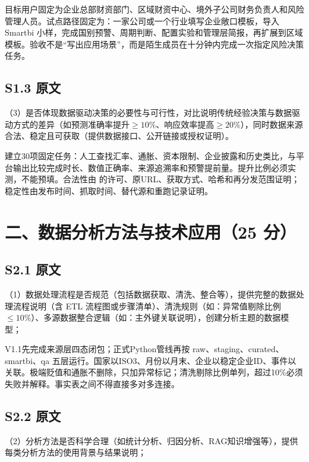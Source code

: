 \begin{decisionbox}[S1.2 怎么做]
目标用户固定为企业总部财资部门、区域财资中心、境外子公司财务负责人和风险管理人员。试点路径固定为：一家公司或一个行业填写企业敞口模板，导入 Smartbi 小样，完成国别预警、周期判断、配置实验和管理层简报，再扩展到区域模板。验收不是“写出应用场景”，而是陌生成员在十分钟内完成一次指定风险决策任务。
\end{decisionbox}

\subsection*{S1.3 原文}
（3）是否体现数据驱动决策的必要性与可行性，对比说明传统经验决策与数据驱动方式的差异（如预测准确率提升$\geq 10\%$、响应效率提高$\geq 20\%$），同时数据来源合法、稳定且可获取（提供数据接口、公开链接或授权证明）。

\begin{decisionbox}[S1.3 怎么做]
建立30项固定任务：人工查找汇率、通胀、资本限制、企业披露和历史类比，与平台输出比较完成时长、数值正确率、来源追溯率和预警提前量。提升比例必须实测，不能预填。合法性由  的许可、原URL、获取方式、哈希和再分发范围证明；稳定性由发布时间、抓取时间、替代源和重跑记录证明。
\end{decisionbox}

\section{二、数据分析方法与技术应用（25 分）}

\subsection*{S2.1 原文}
（1）数据处理流程是否规范（包括数据获取、清洗、整合等），提供完整的数据处理流程说明（含 ETL 流程图或步骤清单）、清洗规则（如：异常值剔除比例$\leq 10\%$）、多源数据整合逻辑（如：主外键关联说明），创建分析主题的数据模型；

\begin{decisionbox}[S2.1 怎么做]
V1.1先完成来源层四态闭包；正式Python管线再按 raw、staging、curated、smartbi、qa 五层运行。国家以ISO3、月份以月末、企业以稳定企业ID、事件以  关联。极端贬值和通胀不删除，只加异常标记；清洗剔除比例单列，超过10\%必须失败并解释。事实表之间不得直接多对多连接。
\end{decisionbox}

\subsection*{S2.2 原文}
（2）分析方法是否科学合理（如统计分析、归因分析、RAG知识增强等），提供每类分析方法的使用背景与结果说明；


